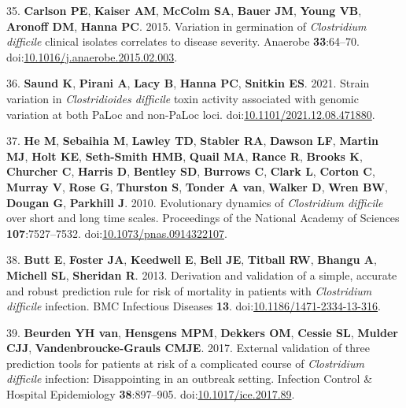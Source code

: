 \documentclass[
  12pt,
]{article}
\newenvironment{cslreferences}%
  {}%
  {\par}
\begin{document}
\begin{cslreferences}
\leavevmode\hypertarget{ref-Carlson2015}{}%
35. \textbf{Carlson PE}, \textbf{Kaiser AM}, \textbf{McColm SA},
\textbf{Bauer JM}, \textbf{Young VB}, \textbf{Aronoff DM}, \textbf{Hanna
PC}. 2015. Variation in germination of \emph{Clostridium difficile}
clinical isolates correlates to disease severity. Anaerobe
\textbf{33}:64--70.
doi:\href{https://doi.org/10.1016/j.anaerobe.2015.02.003}{10.1016/j.anaerobe.2015.02.003}.

\leavevmode\hypertarget{ref-Saund2021}{}%
36. \textbf{Saund K}, \textbf{Pirani A}, \textbf{Lacy B}, \textbf{Hanna
PC}, \textbf{Snitkin ES}. 2021. Strain variation in \emph{Clostridioides
difficile} toxin activity associated with genomic variation at both
PaLoc and non-PaLoc loci.
doi:\href{https://doi.org/10.1101/2021.12.08.471880}{10.1101/2021.12.08.471880}.

\leavevmode\hypertarget{ref-He2010}{}%
37. \textbf{He M}, \textbf{Sebaihia M}, \textbf{Lawley TD},
\textbf{Stabler RA}, \textbf{Dawson LF}, \textbf{Martin MJ},
\textbf{Holt KE}, \textbf{Seth-Smith HMB}, \textbf{Quail MA},
\textbf{Rance R}, \textbf{Brooks K}, \textbf{Churcher C}, \textbf{Harris
D}, \textbf{Bentley SD}, \textbf{Burrows C}, \textbf{Clark L},
\textbf{Corton C}, \textbf{Murray V}, \textbf{Rose G}, \textbf{Thurston
S}, \textbf{Tonder A van}, \textbf{Walker D}, \textbf{Wren BW},
\textbf{Dougan G}, \textbf{Parkhill J}. 2010. Evolutionary dynamics of
\emph{Clostridium difficile} over short and long time scales.
Proceedings of the National Academy of Sciences \textbf{107}:7527--7532.
doi:\href{https://doi.org/10.1073/pnas.0914322107}{10.1073/pnas.0914322107}.

\leavevmode\hypertarget{ref-Butt2013}{}%
38. \textbf{Butt E}, \textbf{Foster JA}, \textbf{Keedwell E},
\textbf{Bell JE}, \textbf{Titball RW}, \textbf{Bhangu A},
\textbf{Michell SL}, \textbf{Sheridan R}. 2013. Derivation and
validation of a simple, accurate and robust prediction rule for risk of
mortality in patients with \emph{Clostridium difficile} infection. BMC
Infectious Diseases \textbf{13}.
doi:\href{https://doi.org/10.1186/1471-2334-13-316}{10.1186/1471-2334-13-316}.

\leavevmode\hypertarget{ref-vanBeurden2017}{}%
39. \textbf{Beurden YH van}, \textbf{Hensgens MPM}, \textbf{Dekkers OM},
\textbf{Cessie SL}, \textbf{Mulder CJJ}, \textbf{Vandenbroucke-Grauls
CMJE}. 2017. External validation of three prediction tools for patients
at risk of a complicated course of \emph{Clostridium difficile}
infection: Disappointing in an outbreak setting. Infection Control \&
Hospital Epidemiology \textbf{38}:897--905.
doi:\href{https://doi.org/10.1017/ice.2017.89}{10.1017/ice.2017.89}.


\end{cslreferences}
\end{document}
